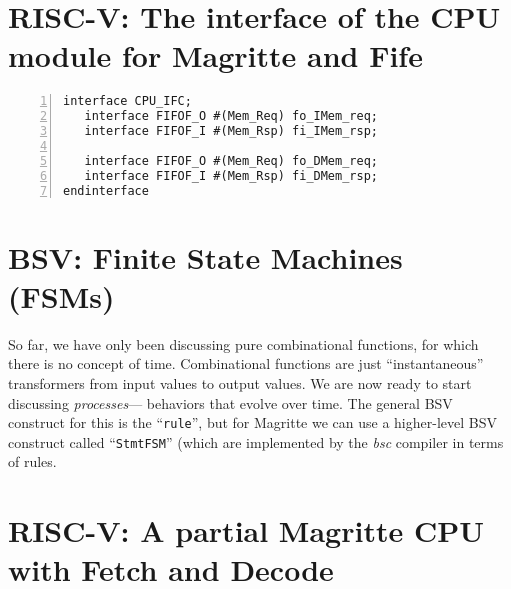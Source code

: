 \section{RISC-V: The interface of the CPU module for Magritte and Fife}

\label{Sec_Magritte_Fetch_Decode_CPU_interface}


\begin{Verbatim}[frame=single, numbers=left]
interface CPU_IFC;
   interface FIFOF_O #(Mem_Req) fo_IMem_req;
   interface FIFOF_I #(Mem_Rsp) fi_IMem_rsp;

   interface FIFOF_O #(Mem_Req) fo_DMem_req;
   interface FIFOF_I #(Mem_Rsp) fi_DMem_rsp;
endinterface
\end{Verbatim}



\section{BSV: Finite State Machines (FSMs)}

\label{Sec_Magritte_Fetch_Decode_FSMs}


So far, we have only been discussing pure combinational functions, for
which there is no concept of time.  Combinational functions are just
``instantaneous'' transformers from input values to output values.  We
are now ready to start discussing \emph{processes}--- behaviors that
evolve over time.  The general BSV construct for this is the
``\verb|rule|'', but for Magritte we can use a higher-level BSV
construct called ``\verb|StmtFSM|'' (which are implemented by the
\emph{bsc} compiler in terms of rules.


\section{RISC-V: A partial Magritte CPU with Fetch and Decode}

\label{Sec_Magritte_Fetch_Decode_Magritte_Fetch_Decode}


